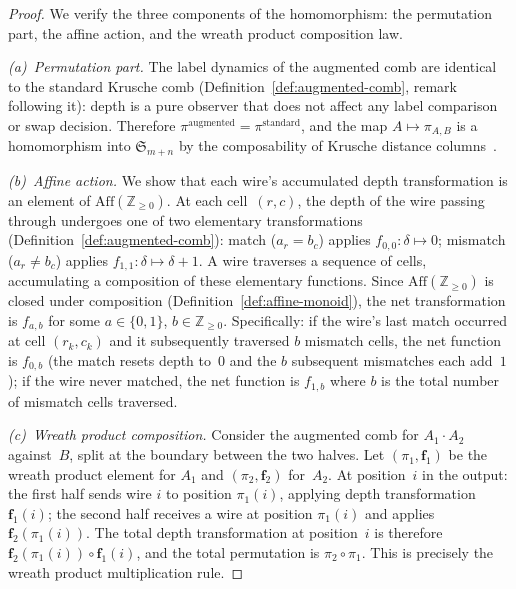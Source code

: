 \documentclass[11pt, a4paper]{article}
\theoremstyle{definition}
\theoremstyle{remark}
\newcommand{\perm}{\pi}
\begin{document}
\begin{proof}
We verify the three components of the homomorphism: the
permutation part, the affine action, and the wreath product
composition law.

\emph{(a)~Permutation part.}\enspace
The label dynamics of the augmented comb are identical to the
standard Krusche comb
(Definition~\ref{def:augmented-comb}, remark following it):
depth is a pure observer that does not affect any label
comparison or swap decision.
Therefore
$\perm^{\mathrm{augmented}} = \perm^{\mathrm{standard}}$,
and the map $A \mapsto \perm_{A,B}$ is a homomorphism into
$\mathfrak{S}_{m+n}$ by the composability of Krusche distance
columns~\cite{tiskin2008semi}.

\emph{(b)~Affine action.}\enspace
We show that each wire's accumulated depth transformation is an
element of $\mathrm{Aff}(\mathbb{Z}_{\geq 0})$.
At each
cell~$(r,c)$, the depth of the wire passing through undergoes
one of two elementary transformations
(Definition~\ref{def:augmented-comb}):
match ($a_r = b_c$) applies $f_{0,0}: \delta \mapsto 0$;
mismatch ($a_r \ne b_c$) applies $f_{1,1}: \delta \mapsto
\delta + 1$.
A wire traverses a sequence of cells,
accumulating a composition of these elementary functions.
Since $\mathrm{Aff}(\mathbb{Z}_{\geq 0})$ is closed under
composition (Definition~\ref{def:affine-monoid}), the net
transformation is $f_{a,b}$ for some $a \in \{0,1\}$,
$b \in \mathbb{Z}_{\geq 0}$.
Specifically: if the wire's
last match occurred at cell $(r_k, c_k)$ and it subsequently
traversed $b$ mismatch cells, the net function is $f_{0,b}$
(the match resets depth to~$0$ and the $b$ subsequent
mismatches each add~$1$);
if the wire never matched, the net
function is $f_{1,b}$ where $b$ is the total number of
mismatch cells traversed.

\emph{(c)~Wreath product composition.}\enspace
Consider the augmented comb for $A_1 \cdot A_2$ against~$B$,
split at the boundary between the two halves.
Let
$(\perm_1, \mathbf{f}_1)$ be the wreath product element for
$A_1$ and $(\perm_2, \mathbf{f}_2)$ for~$A_2$.
At
position~$i$ in the output: the first half sends wire $i$ to
position $\perm_1(i)$, applying depth transformation
$\mathbf{f}_1(i)$;
the second half receives a wire at position
$\perm_1(i)$ and applies $\mathbf{f}_2(\perm_1(i))$.
The
total depth transformation at position~$i$ is therefore
$\mathbf{f}_2(\perm_1(i)) \circ \mathbf{f}_1(i)$, and the
total permutation is $\perm_2 \circ \perm_1$.
This is
precisely the wreath product multiplication rule.
\end{proof}
\end{document}

